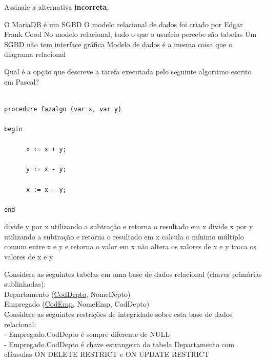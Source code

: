 \documentclass[12pt, addpoints]{exam}
\begin{document}
\begin{questions}
\question Assinale a alternativa \textbf{incorreta}:
\begin{choices}
\choice O MariaDB é um SGBD
\choice O modelo relacional de dados foi criado por Edgar Frank Cood
\choice No modelo relacional, tudo o que o usuário percebe são tabelas
\choice Um SGBD não tem interface gráfica
\choice Modelo de dados é a mesma coisa que o diagrama relacional
\end{choices}

\question

Qual é a opção que descreve a tarefa executada pelo seguinte algoritmo escrito em Pascal? 

\begin{verbatim} 

procedure fazalgo (var x, var y)

begin 

	  x := x + y; 

	  y := x - y;

	  x := x - y; 

end 

\end{verbatim}
\begin{choices}
\choice divide y por x utilizando a subtração e retorna o resultado em x
\choice divide x por y utilizando a subtração e retorna o resultado em x
\choice calcula o mínimo múltiplo comum entre x e y e retorna o valor em x
\choice não altera os valores de x e y
\choice troca os valores de x e y
\end{choices}

\question

Considere as seguintes tabelas em uma base de dados relacional (chaves primárias sublinhadas):\\

Departamento (\underline{CodDepto}, NomeDepto)\\

Empregado (\underline{CodEmp}, NomeEmp, CodDepto)\\

Considere as seguintes restrições de integridade sobre esta base de dados relacional:\\

- Empregado.CodDepto é sempre diferente de NULL\\

- Empregado.CodDepto é chave estrangeira da tabela Departamento com cláusulas ON DELETE RESTRICT e ON UPDATE RESTRICT\\


\end{questions}
\end{document}
